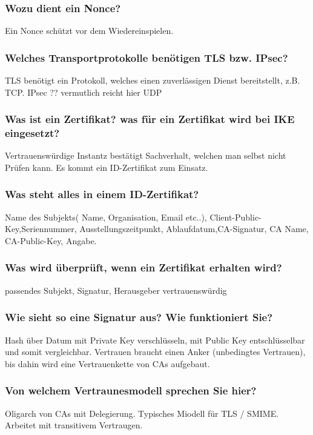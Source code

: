 	\subsubsection{Wozu dient ein Nonce?}
	Ein Nonce schützt vor dem Wiedereinspielen. 
	
	\subsubsection{Welches Transportprotokolle benötigen TLS bzw. IPsec?}
	TLS benötigt ein Protokoll, welches einen zuverlässigen Dienst bereitstellt, z.B. TCP. IPsec ?? vermutlich reicht hier UDP

	
	\subsubsection{Was ist ein Zertifikat? was für ein Zertifikat wird bei IKE eingesetzt?}
	Vertrauenswürdige Instantz bestätigt Sachverhalt, welchen man selbst nicht Prüfen kann. Es kommt ein ID-Zertifikat zum Einsatz.	
	
	\subsubsection{Was steht alles in einem ID-Zertifikat?}
	Name des Subjekts( Name, Organisation, Email etc..), Client-Public-Key,Seriennummer, Ausstellungszeitpunkt, Ablaufdatum,CA-Signatur, CA Name, CA-Public-Key,   Angabe. 	
	
	\subsubsection{Was wird überprüft, wenn ein Zertifikat erhalten wird?}
	passendes Subjekt, Signatur, Herausgeber vertrauenswürdig
	
	\subsubsection{Wie sieht so eine Signatur aus? Wie funktioniert Sie?}
	Hash über Datum mit Private Key verschlüsseln, mit Public Key entschlüsselbar und somit vergleichbar. Vertrauen braucht einen Anker (unbedingtes Vertrauen), bis dahin wird eine Vertrauenkette von CAs aufgebaut.
	
	\subsubsection{Von welchem Vertraunesmodell sprechen Sie hier?}
	Oligarch von CAs mit Delegierung. Typisches Miodell für TLS / SMIME. Arbeitet mit transitivem Vertraugen.
	
